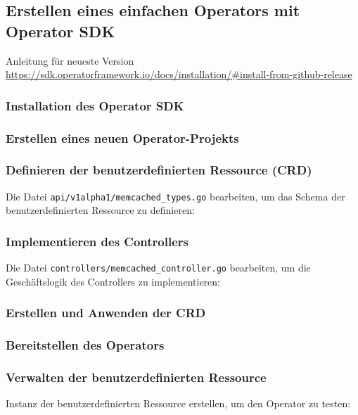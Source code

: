\subsection{Erstellen eines einfachen Operators mit Operator SDK}
Anleitung für neueste Version\\
\url{https://sdk.operatorframework.io/docs/installation/#install-from-github-release}

\subsubsection{Installation des Operator SDK}


\subsubsection{Erstellen eines neuen Operator-Projekts}


\subsubsection{Definieren der benutzerdefinierten Ressource (CRD)}

Die Datei \texttt{api/v1alpha1/memcached\_types.go} bearbeiten, um das Schema der benutzerdefinierten Ressource zu definieren:


\subsubsection{Implementieren des Controllers}
Die Datei \texttt{controllers/memcached\_controller.go} bearbeiten, um die Geschäftslogik des Controllers zu implementieren:


\subsubsection{Erstellen und Anwenden der CRD}


\subsubsection{Bereitstellen des Operators}


\subsubsection{Verwalten der benutzerdefinierten Ressource}
Instanz der benutzerdefinierten Ressource erstellen, um den Operator zu testen:


